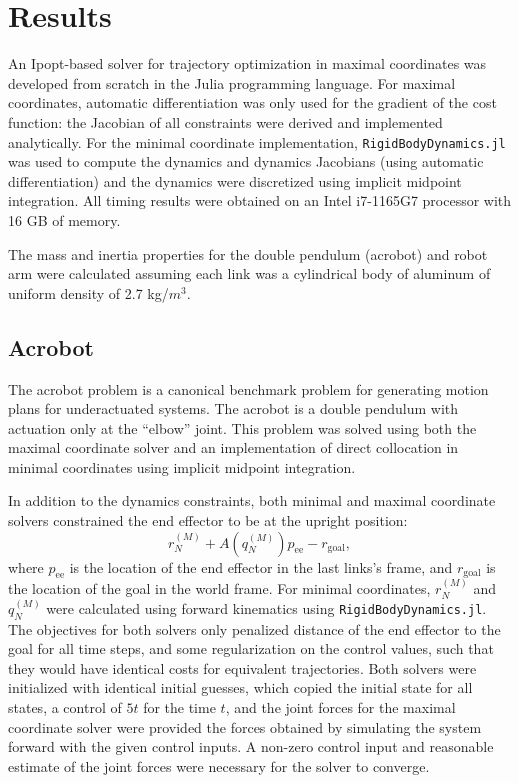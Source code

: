 \documentclass[conference]{IEEEtran}
\begin{document}
\section{Results}
An Ipopt-based solver for trajectory optimization in maximal coordinates was developed from 
scratch in the Julia programming language. For maximal coordinates, automatic differentiation 
was only used for the gradient 
of the cost function: the Jacobian of all constraints were derived and implemented 
analytically. For the minimal coordinate implementation, \texttt{RigidBodyDynamics.jl} was used to 
compute the dynamics and dynamics Jacobians (using automatic differentiation) and the 
dynamics were discretized using implicit 
midpoint integration. All timing results were obtained on an Intel i7-1165G7 processor with
16 GB of memory.

The mass and inertia properties for the double pendulum (acrobot) and robot arm were 
calculated assuming each link was a cylindrical body of aluminum of uniform density of 
2.7 kg/$m^3$.

\subsection{Acrobot}
The acrobot problem is a canonical benchmark problem for generating motion plans for 
underactuated systems. The acrobot is a double pendulum with actuation only at the ``elbow''
joint. This problem was solved using both the maximal coordinate solver and an implementation
of direct collocation in minimal coordinates using implicit midpoint integration.

In addition to the dynamics constraints, both minimal and maximal coordinate solvers 
constrained the end effector to be at the upright position:
\begin{equation}
    r_N^{(M)} + A(q_N^{(M)}) p_\text{ee} - r_\text{goal},
\end{equation}
where $p_\text{ee}$ is the location of the end effector in the last links's frame, and
$r_\text{goal}$ is the location of the goal in the world frame.
For minimal coordinates, $r_N^{(M)}$ and $q_N^{(M)}$ were calculated using forward 
kinematics using \texttt{RigidBodyDynamics.jl}. The objectives for both solvers only 
penalized distance of the end effector to the goal for all time steps, and some 
regularization on the control values, such that they would have identical costs for 
equivalent trajectories. Both solvers were initialized with identical 
initial guesses, which copied the initial state for all states, a control of $5 t$ for 
the time $t$, and the joint forces for the maximal coordinate solver were provided the forces 
obtained by simulating the system forward with the given control inputs. A non-zero control 
input and reasonable estimate of the joint forces were necessary for the solver to converge.
\end{document}

